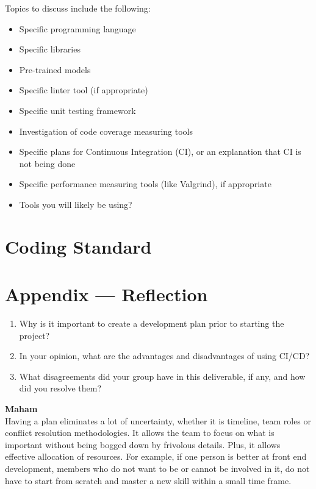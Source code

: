 \documentclass{article}
\begin{document}
Topics to discuss include the following:

\begin{itemize}
\item Specific programming language
\item Specific libraries
\item Pre-trained models
\item Specific linter tool (if appropriate)
\item Specific unit testing framework
\item Investigation of code coverage measuring tools
\item Specific plans for Continuous Integration (CI), or an explanation that CI
  is not being done
\item Specific performance measuring tools (like Valgrind), if
  appropriate
\item Tools you will likely be using?
\end{itemize}


\section{Coding Standard}


\newpage{}

\section*{Appendix --- Reflection}



\begin{enumerate}
    \item Why is it important to create a development plan prior to starting the
    project?
    \item In your opinion, what are the advantages and disadvantages of using
    CI/CD?
    \item What disagreements did your group have in this deliverable, if any,
    and how did you resolve them?
\end{enumerate}
\textbf{Maham} \\
Having a plan eliminates a lot of uncertainty, whether it is timeline, team roles or conflict resolution methodologies. It allows the team to focus on what is important without being bogged down by frivolous details. Plus, it allows effective allocation of resources. For example, if one person is better at front end development, members who do not want to be or cannot be involved in it, do not have to start from scratch and master a new skill within a small time frame. 
\end{document}

